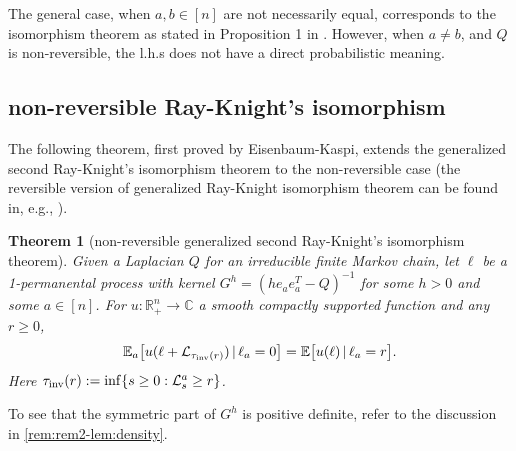 \documentclass[a4paper, 11pt]{article}
\newcommand{\E}{\mathbb{E}}
\newcommand{\Ell}{\mathcal{L}}
\newcommand{\inv}{\tau_\textnormal{inv}}
\newcommand{\orthp}{{\mathbb{R}_+^n}}
\newtheorem{thm}{Theorem}[section]
\begin{document}
The general case, when $a,b\in[n]$ are not necessarily equal, corresponds to the isomorphism theorem as stated in Proposition 1 in \cite{lejan08}. However, when $a\neq b$, and $Q$ is non-reversible, the l.h.s does not have a direct probabilistic meaning.

\subsection{non-reversible Ray-Knight's isomorphism}

The following theorem, first proved by Eisenbaum-Kaspi\cite{ek09}, extends the generalized second Ray-Knight's isomorphism theorem to the non-reversible case (the reversible version of generalized Ray-Knight isomorphism theorem can be found in, e.g., \cite{sznitman12}).

\vspace{.3em} \begin{thm}[non-reversible generalized second Ray-Knight's isomorphism theorem]
\label{thm:rayknight}
Given a Laplacian $Q$ for an irreducible finite Markov chain, let $\ell$ be a 1-permanental process with kernel $G^h=(he_ae_a^T-Q)^{-1}$ for some $h>0$ and some $a\in[n]$. For $ u:\orthp\rightarrow \mathbb{C}$ a smooth compactly supported function and any $r\geq 0$,
\[\E_a\big[ u(\ell+\Ell_{\inv(r)})\,|\,\ell_a=0\big]=\E\big[ u(\ell)\,|\,\ell_a=r\big].\]
Here $\inv(r):=\inf\{s\geq 0: \Ell_s^a\geq r\}$.
\end{thm}

To see that the symmetric part of $G^h$ is positive definite, refer to the discussion in \cref{rem:rem2-lem:density}.
\end{document}
